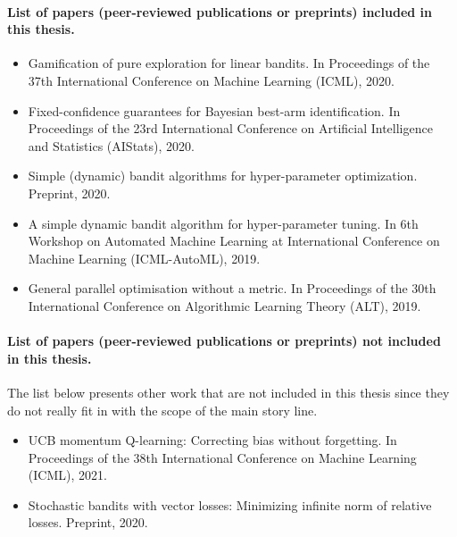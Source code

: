 \paragraph{List of papers (peer-reviewed publications or preprints) included in this thesis.}

\begin{itemize}[label=]
    \item Gamification of pure exploration for linear bandits. In Proceedings of the 37th International Conference on Machine Learning (ICML), 2020.~\citep{degenne2020game}
    \item Fixed-confidence guarantees for Bayesian best-arm identification. In Proceedings of the 23rd International Conference on Artificial Intelligence and Statistics (AIStats), 2020.\citep{shang2020t3c}
    \item Simple (dynamic) bandit algorithms for hyper-parameter optimization. Preprint, 2020.~\citep{shang2020dttts}
    \item A simple dynamic bandit algorithm for hyper-parameter tuning. In 6th Workshop on Automated Machine Learning at International Conference on Machine Learning (ICML-AutoML), 2019.~\citep{shang2019dttts}
    \item General parallel optimisation without a metric. In Proceedings of the 30th International Conference on Algorithmic Learning Theory (ALT), 2019.~\citep{shang2019adaptive}
\end{itemize}

\paragraph{List of papers (peer-reviewed publications or preprints) not included in this thesis.}

The list below presents other work that are not included in this thesis since they do not really fit in with the scope of the main story line.

\begin{itemize}[label=]
    \item UCB momentum Q-learning: Correcting bias without forgetting. In Proceedings of the 38th International Conference on Machine Learning (ICML), 2021.~\citep{menard2021ucbmq}
    \item Stochastic bandits with vector losses: Minimizing infinite norm of relative losses. Preprint, 2020.~\citep{shang2020vector}
\end{itemize}

